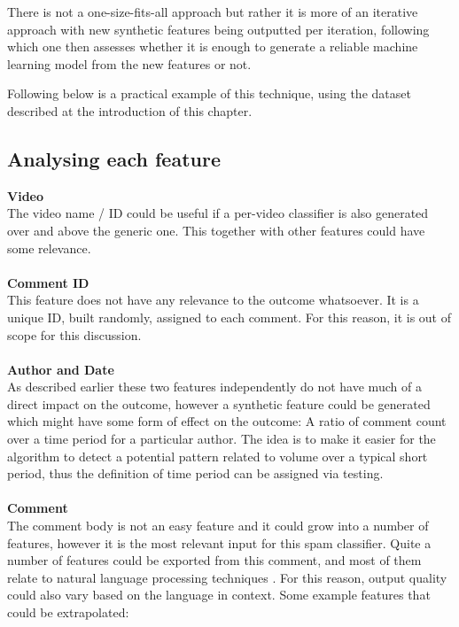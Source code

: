 There is not a one-size-fits-all approach but rather it is more of an iterative approach with new synthetic features being outputted per iteration, following which one then assesses whether it is enough to generate a reliable machine learning model from the new features or not.

Following below is a practical example of this technique, using the dataset described at the introduction of this chapter.

\subsection{Analysing each feature} 

\textbf{Video}
\\
The video name / ID could be useful if a per-video classifier is also generated over and above the generic one. This together with other features could have some relevance.
\\
\\
\textbf{Comment ID}
\\
This feature does not have any relevance to the outcome whatsoever. It is a unique ID, built randomly, assigned to each comment. For this reason, it is out of scope for this discussion.
\\
\\
\textbf{Author and Date}
\\
As described earlier these two features independently do not have much of a direct impact on the outcome, however a synthetic feature could be generated which might have some form of effect on the outcome: A ratio of comment count over a time period for a particular author.
The idea is to make it easier for the algorithm to detect a potential pattern related to volume over a typical short period, thus the definition of time period can be assigned via testing.
\\
\\
\textbf{Comment}
\\
The comment body is not an easy feature and it could grow into a number of features, however it is the most relevant input for this spam classifier.
Quite a number of features could be exported from this comment, and most of them relate to natural language processing techniques \citep{CormackSMSFilter}. For this reason, output quality could also vary based on the language in context.
Some example features that could be extrapolated:

